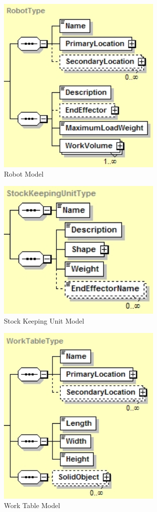 \begin{figure}[htb!]
\centering
\includegraphics[width=3.166in]{images/robot.jpg}
\caption{Robot Model}
\label{fig:Robot}
\end{figure}

\begin{figure}[htb!]
\centering
\includegraphics[width=3.166in]{images/sku.jpg}
\caption{Stock Keeping Unit Model}
\label{fig:SKU}
\end{figure}

\begin{figure}[htb!]
\centering
\includegraphics[width=3.166in]{images/worktable.jpg}
\caption{Work Table Model}
\label{fig:WorkTable}
\end{figure}

